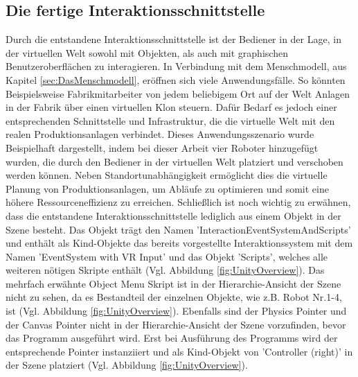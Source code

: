 \subsection{Die fertige Interaktionsschnittstelle}\label{sec:ZusammenfassungInteraktion}
Durch die entstandene Interaktionsschnittstelle ist der Bediener in der Lage, in der virtuellen Welt sowohl mit Objekten, als auch mit graphischen Benutzeroberflächen zu interagieren. In Verbindung mit dem Menschmodell, aus Kapitel \ref{sec:DasMenschmodell}, eröffnen sich viele Anwendungsfälle. So könnten Beispielsweise Fabrikmitarbeiter von jedem beliebigem Ort auf der Welt Anlagen in der Fabrik über einen virtuellen Klon steuern. Dafür Bedarf es jedoch einer entsprechenden Schnittstelle und Infrastruktur, die die virtuelle Welt mit den realen Produktionsanlagen verbindet. Dieses Anwendungsszenario wurde Beispielhaft dargestellt, indem bei dieser Arbeit vier Roboter hinzugefügt wurden, die durch den Bediener in der virtuellen Welt platziert und verschoben werden können. Neben Standortunabhängigkeit ermöglicht dies die virtuelle Planung von Produktionsanlagen, um Abläufe zu optimieren und somit eine höhere Ressourceneffizienz zu erreichen.
\newline
Schließlich ist noch wichtig zu erwähnen, dass die entstandene Interaktionsschnittstelle lediglich aus einem Objekt in der Szene besteht. Das Objekt trägt den Namen 'InteractionEventSystemAndScripts' und enthält als Kind-Objekte das bereits vorgestellte Interaktionssystem mit dem Namen 'EventSystem with VR Input' und das Objekt 'Scripts', welches alle weiteren nötigen Skripte enthält (Vgl. Abbildung \ref{fig:UnityOverview}). Das mehrfach erwähnte Object Menu Skript ist in der Hierarchie-Ansicht der Szene nicht zu sehen, da es Bestandteil der einzelnen Objekte, wie z.B. Robot Nr.1-4, ist (Vgl. Abbildung \ref{fig:UnityOverview}). Ebenfalls sind der Physics Pointer und der Canvas Pointer nicht in der Hierarchie-Ansicht der Szene vorzufinden, bevor das Programm ausgeführt wird. Erst bei Ausführung des Programms wird der entsprechende Pointer instanziiert und als Kind-Objekt von 'Controller (right)' in der Szene platziert (Vgl. Abbildung \ref{fig:UnityOverview}).